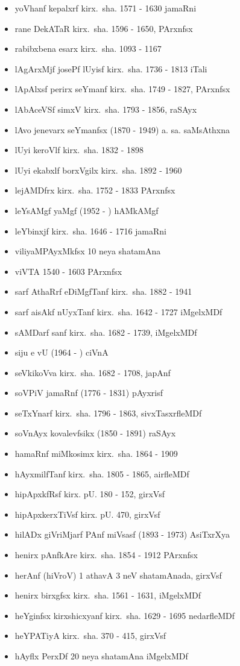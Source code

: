 {\begin{itemize}
\item yoVhanf kepalxrf kirx.~sha. {\rm 1571 - 1630} jamaRni
\item rane DekATaR kirx.~sha. {\rm 1596 - 1650}, PArxnfsx
\item rabibxbena esarx kirx.~sha. {\rm 1093 - 1167}
\item lAgArxMjf josePf lUyisf kirx.~sha. {\rm 1736 - 1813} iTali
\item lApAlxsf perirx seYmanf kirx.~sha. {\rm 1749 - 1827}, PArxnfsx
\item lAbAceVSf simxV kirx.~sha. {\rm 1793 - 1856}, raSAyx
\item lAvo jenevarx seYmanfsx {\rm (1870 - 1949)} a. sa. saMsAthxna
\item lUyi keroVlf kirx.~sha. {\rm 1832 - 1898}
\item lUyi ekabxlf borxVgilx kirx.~sha. {\rm 1892 - 1960}
\item lejAMDfrx kirx.~sha. {\rm 1752 - 1833} PArxnfsx
\item leYsAMgf yaMgf {\rm (1952 - )} hAMkAMgf 
\item leYbinxjf kirx.~sha. {\rm 1646 - 1716} jamaRni
\item viliyaMPAyxMkfsx {\rm 10} neya shatamAna
\item viVTA {\rm 1540 - 1603} PArxnfsx
\item sarf AthaRrf eDiMgfTanf kirx.~sha. {\rm 1882 - 1941}
\item sarf aisAkf nUyxTanf kirx.~sha. {\rm 1642 - 1727} iMgelxMDf
\item sAMDarf sanf kirx.~sha. {\rm 1682 - 1739}, iMgelxMDf
\item siju e vU {\rm (1964 - )} ciVnA
\item seVkikoVva kirx.~sha. {\rm 1682 - 1708}, japAnf
\item soVPiV jamaRnf {\rm (1776 - 1831)} pAyxrisf
\item seTxYnarf kirx.~sha. {\rm 1796 - 1863}, sivxTasxrfleMDf
\item soVnAyx kovalevfsikx {\rm (1850 - 1891)} raSAyx
\item hamaRnf miMkosimx kirx.~sha. {\rm 1864 - 1909}
\item hAyxmilfTanf kirx.~sha. {\rm 1805 - 1865}, airfleMDf
\item hipApxkfRsf kirx. pU. {\rm 180 - 152}, girxVsf
\item hipApxkerxTiVsf kirx. pU. {\rm 470}, girxVsf
\item hilADx giVriMjarf PAnf miVsasf {\rm (1893 - 1973)} AsiTxrXya
\item henirx pAnfkAre kirx.~sha. {\rm 1854 - 1912} PArxnfsx
\item herAnf (hiVroV) {\rm 1} athavA {\rm 3} neV shatamAnada, girxVsf
\item henirx birxgfsx kirx.~sha. {\rm 1561 - 1631}, iMgelxMDf
\item heYginfsx kirxshicxyanf kirx.~sha. {\rm 1629 - 1695} nedarfleMDf
\item heYPATiyA kirx.~sha. {\rm 370 - 415}, girxVsf
\item hAyflx PerxDf {\rm 20} neya shatamAna iMgelxMDf
\end{itemize}

}
